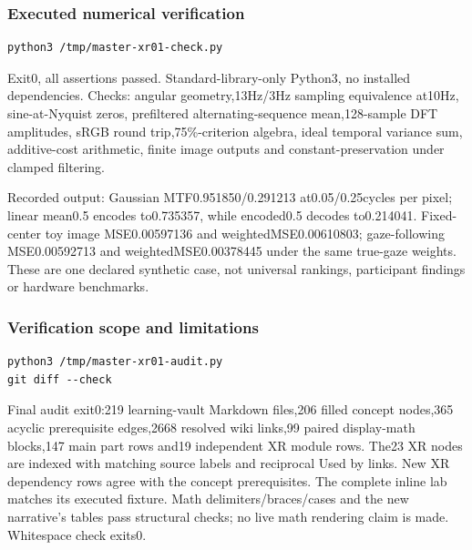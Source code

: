\subsubsection{Executed numerical verification}\label{appendix-a103e7846d21-executed-numerical-verification}

\hypertarget{appendix-a103e7846d21-executed-numerical-verification}{}

\begin{verbatim}
python3 /tmp/master-xr01-check.py
\end{verbatim}

Exit0, all assertions passed. Standard-library-only Python3, no installed dependencies. Checks: angular geometry,13Hz/3Hz sampling equivalence at10Hz, sine-at-Nyquist zeros, prefiltered alternating-sequence mean,128-sample DFT amplitudes, sRGB round trip,75\%-criterion algebra, ideal temporal variance sum, additive-cost arithmetic, finite image outputs and constant-preservation under clamped filtering.

Recorded output: Gaussian MTF0.951850/0.291213 at0.05/0.25cycles per pixel; linear mean0.5 encodes to0.735357, while encoded0.5 decodes to0.214041. Fixed-center toy image MSE0.00597136 and weightedMSE0.00610803; gaze-following MSE0.00592713 and weightedMSE0.00378445 under the same true-gaze weights. These are one declared synthetic case, not universal rankings, participant findings or hardware benchmarks.

\subsubsection{Verification scope and limitations}\label{appendix-a103e7846d21-verification-scope-and-limitations}

\hypertarget{appendix-a103e7846d21-verification-scope-and-limitations}{}

\begin{verbatim}
python3 /tmp/master-xr01-audit.py
git diff --check
\end{verbatim}

Final audit exit0:219 learning-vault Markdown files,206 filled concept nodes,365 acyclic prerequisite edges,2668 resolved wiki links,99 paired display-math blocks,147 main part rows and19 independent XR module rows. The23 XR nodes are indexed with matching source labels and reciprocal Used by links. New XR dependency rows agree with the concept prerequisites. The complete inline lab matches its executed fixture. Math delimiters/braces/cases and the new narrative's tables pass structural checks; no live math rendering claim is made. Whitespace check exits0.

